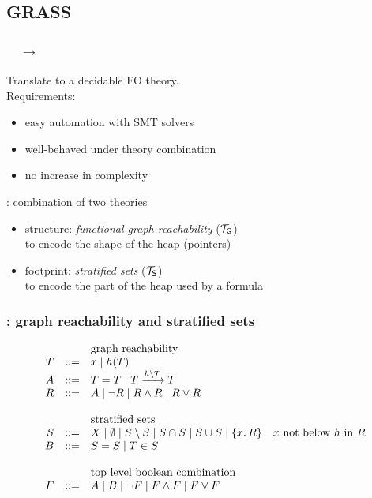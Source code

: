 \documentclass{beamer}
\begin{document}
\subsection{GRASS}

\begin{frame}
  \frametitle{\JoshLogic $\quad \rightarrow \quad$ \LRJQ}

  Translate \JoshLogic to a decidable FO theory.\\[1ex]

  Requirements:
  \begin{itemize}
  \item easy automation with SMT solvers
  \item well-behaved under theory combination
  \item no increase in complexity
  \end{itemize}  

  \vspace{1ex}

  \LRJQ: combination of two theories
  \begin{itemize}
  \item structure: \emph{functional graph reachability} ($\mathcal{T}_{\mathsf{G}}$)\\ to encode the shape of the heap (pointers)
  \item footprint: \emph{stratified sets} ($\mathcal{T}_{\mathsf{S}}$)\\ to encode the part of the heap used by a formula
  \end{itemize}  
  

\end{frame}


\begin{frame}
  \frametitle{\LRJQ: graph reachability and stratified sets}

\begin{equation*}
\begin{array}{rcl}
  & & \text{graph reachability} \\
  T & ::= & x \mid h(T) \\
  A & ::= & T = T \mid T \xrightarrow{h \setminus T} T \\
  R & ::= & A \mid \neg R \mid R \land R \mid R \lor R \\
   & & \\
  & & \text{stratified sets} \\
  S & ::= & X \mid \emptyset \mid S \setminus S \mid S \cap S \mid S \cup S \mid \{x.\,R\} \quad \text{$x$ not below $h$ in $R$} \\
  B & ::= & S = S \mid T \in S \\
   & & \\
  & & \text{top level boolean combination} \\
  F & ::= & A \mid B \mid \lnot F \mid F \land F \mid F \lor F 
  \end{array} 
\end{equation*}

\end{frame}
\end{document}
